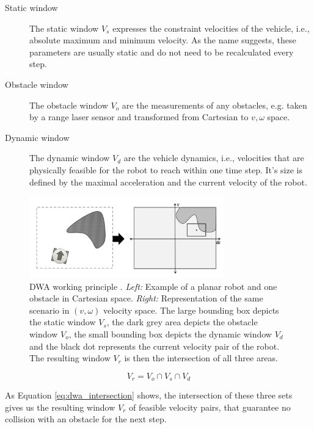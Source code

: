 \begin{description}
\item[Static window] The static window $V_s$ expresses the constraint velocities of the vehicle, i.e., absolute maximum and minimum velocity. As the name suggests, these parameters are usually static and do not need to be recalculated every step.

\item[Obstacle window] The obstacle window $V_o$ are the measurements of any obstacles, e.g. taken by a range laser sensor and transformed from Cartesian to $v,\omega$ space.

\item[Dynamic window]The dynamic window $V_d$ are the vehicle dynamics, i.e., velocities that are physically feasible for the robot to reach within one time step. It's size is defined by the maximal acceleration and the current velocity of the robot.
\end{description}

\begin{figure}
   \centering
   \includegraphics[width=0.75\textwidth]{images/dwa.png}
   \caption{DWA working principle \citep{siegwart2004autonomous}. \emph{Left:} Example of a planar robot and one obstacle in Cartesian space. \emph{Right:} Representation of the same scenario in $(v,\omega)$ velocity space. The large bounding box depicts the static window $V_s$, the dark grey area depicts the obstacle window $V_o$, the small bounding box depicts the dynamic window $V_d$ and the black dot represents the current velocity pair of the robot. The resulting window $V_r$ is then the intersection of all three areas.}
   \label{pics:dwa}
\end{figure}

\begin{equation}
V_r = V_o \cap V_s \cap V_d
 	\label{eq:dwa_intersection}
\end{equation}

As Equation \ref{eq:dwa_intersection} shows, the intersection of these three sets gives us the resulting window $V_r$ of feasible velocity pairs, that guarantee no collision with an obstacle for the next step.

